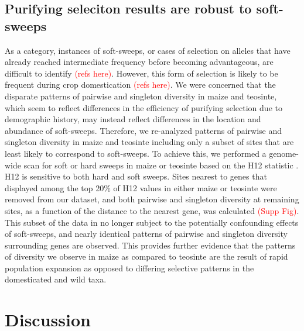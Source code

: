 \documentclass{pnastwo}
\begin{document}
\begin{article}
\subsection{Purifying seleciton results are robust to soft-sweeps}
As a category, instances of soft-sweeps, or cases of selection on alleles that have already reached intermediate frequency before becoming advantageous, are difficult to identify \textcolor{red}{(refs here)}. However, this form of selection is likely to be frequent during crop domestication \textcolor{red}{(refs here)}. We were concerned that the disparate patterns of pairwise and singleton diversity in maize and teosinte, which seem to reflect differences in the efficiency of purifying selection due to demographic history, may instead reflect differences in the location and abundance of soft-sweeps. Therefore, we re-analyzed patterns of pairwise and singleton diversity in maize and teosinte including only a subset of sites that are least likely to correspond to soft-sweeps. To achieve this, we performed a genome-wide scan for soft or hard sweeps in maize or teosinte based on the H12 statistic \cite{garud2015}. H12 is sensitive to both hard and soft sweeps. Sites nearest to genes that displayed among the top 20\% of H12 values in either maize or teosinte were removed from our dataset, and both pairwise and singleton diversity at remaining sites, as a function of the distance to the nearest gene, was calculated \textcolor{red}{(Supp Fig)}. This subset of the data in no longer subject to the potentially confounding effects of soft-sweeps, and nearly identical patterns of pairwise and singleton diversity surrounding genes are observed. This provides further evidence that the patterns of diversity we observe in maize as compared to teosinte are the result of rapid population expansion as opposed to differing selective patterns in the domesticated and wild taxa.

\section{Discussion}

\end{article}
\end{document}

